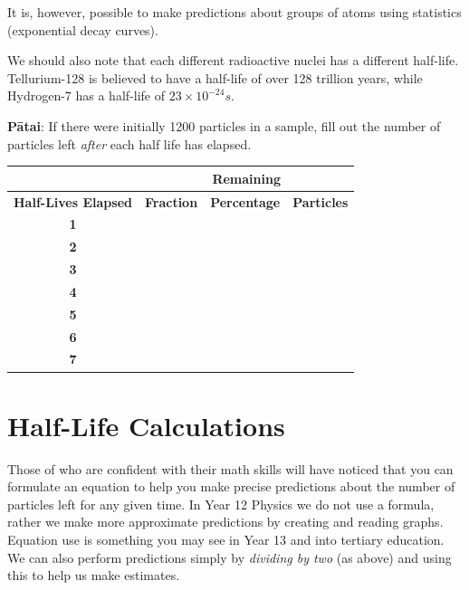 \documentclass[12pt]{report}
\begin{document}
{It is, however, possible to make predictions about groups of atoms using statistics (exponential decay curves).

We should also note that each different radioactive nuclei has a different half-life. Tellurium-128 is believed to have a half-life of over 128 trillion years, while Hydrogen-7 has a half-life of $23\times10^{-24}s$.


\noindent\textbf{Pātai}: If there were initially 1200 particles in a sample, fill out the number of particles left \textit{after} each half life has elapsed.

\begin{table}[h]
\centering
\begin{tabular}{c|c|c|c|}
\cline{2-4}
\textbf{}                                         & \multicolumn{3}{c|}{\textbf{Remaining}}                      \\ \hline
\multicolumn{1}{|c|}{\textbf{Half-Lives Elapsed}} & \textbf{Fraction} & \textbf{Percentage} & \textbf{Particles} \\ \hline
\multicolumn{1}{|c|}{\textbf{1}}                  &                &                   &                    \\ \hline
\multicolumn{1}{|c|}{\textbf{2}}                  &                &                   &                    \\ \hline
\multicolumn{1}{|c|}{\textbf{3}}                  &                &                 &                    \\ \hline
\multicolumn{1}{|c|}{\textbf{4}}                  &               &                 &                    \\ \hline
\multicolumn{1}{|c|}{\textbf{5}}                  &               &                &                    \\ \hline
\multicolumn{1}{|c|}{\textbf{6}}                  &               &               &                    \\ \hline
\multicolumn{1}{|c|}{\textbf{7}}                  &              &              &                    \\ \hline
\end{tabular}
\end{table}

\section{Half-Life Calculations}
Those of who are confident with their math skills will have noticed that you can formulate an equation to help you make precise predictions about the number of particles left for any given time. In Year 12 Physics we do not use a formula, rather we make more approximate predictions by creating and reading graphs. Equation use is something you may see in Year 13 and into tertiary education.
We can also perform predictions simply by \textit{dividing by two} (as above) and using this to help us make estimates.

}
\end{document}
